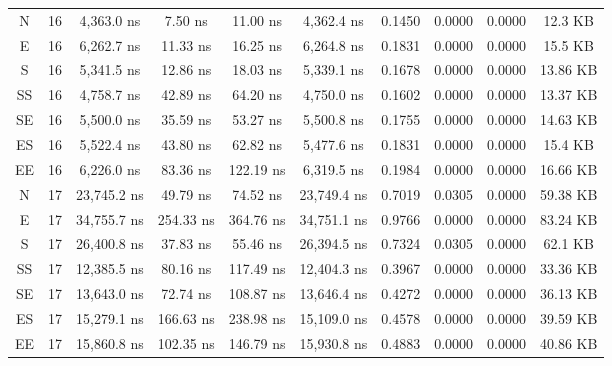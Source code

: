 \begin{sidewaystable}
\begin{tabular}{|c|c|c|c|c|c|c|c|c|c|}
        N      & 16    & 4,363.0 ns     & 7.50 ns      & 11.00 ns     & 4,362.4 ns     & 0.1450   & 0.0000   & 0.0000 & 12.3 KB     \\
        E      & 16    & 6,262.7 ns     & 11.33 ns     & 16.25 ns     & 6,264.8 ns     & 0.1831   & 0.0000   & 0.0000 & 15.5 KB     \\
        S      & 16    & 5,341.5 ns     & 12.86 ns     & 18.03 ns     & 5,339.1 ns     & 0.1678   & 0.0000   & 0.0000 & 13.86 KB    \\
        SS     & 16    & 4,758.7 ns     & 42.89 ns     & 64.20 ns     & 4,750.0 ns     & 0.1602   & 0.0000   & 0.0000 & 13.37 KB    \\
        SE     & 16    & 5,500.0 ns     & 35.59 ns     & 53.27 ns     & 5,500.8 ns     & 0.1755   & 0.0000   & 0.0000 & 14.63 KB    \\
        ES     & 16    & 5,522.4 ns     & 43.80 ns     & 62.82 ns     & 5,477.6 ns     & 0.1831   & 0.0000   & 0.0000 & 15.4 KB     \\
        EE     & 16    & 6,226.0 ns     & 83.36 ns     & 122.19 ns    & 6,319.5 ns     & 0.1984   & 0.0000   & 0.0000 & 16.66 KB    \\
        N      & 17    & 23,745.2 ns    & 49.79 ns     & 74.52 ns     & 23,749.4 ns    & 0.7019   & 0.0305   & 0.0000 & 59.38 KB    \\
        E      & 17    & 34,755.7 ns    & 254.33 ns    & 364.76 ns    & 34,751.1 ns    & 0.9766   & 0.0000   & 0.0000 & 83.24 KB    \\
        S      & 17    & 26,400.8 ns    & 37.83 ns     & 55.46 ns     & 26,394.5 ns    & 0.7324   & 0.0305   & 0.0000 & 62.1 KB     \\
        SS     & 17    & 12,385.5 ns    & 80.16 ns     & 117.49 ns    & 12,404.3 ns    & 0.3967   & 0.0000   & 0.0000 & 33.36 KB    \\
        SE     & 17    & 13,643.0 ns    & 72.74 ns     & 108.87 ns    & 13,646.4 ns    & 0.4272   & 0.0000   & 0.0000 & 36.13 KB    \\
        ES     & 17    & 15,279.1 ns    & 166.63 ns    & 238.98 ns    & 15,109.0 ns    & 0.4578   & 0.0000   & 0.0000 & 39.59 KB    \\
        EE     & 17    & 15,860.8 ns    & 102.35 ns    & 146.79 ns    & 15,930.8 ns    & 0.4883   & 0.0000   & 0.0000 & 40.86 KB    \\
        \hline
    \end{tabular}
\end{sidewaystable}

